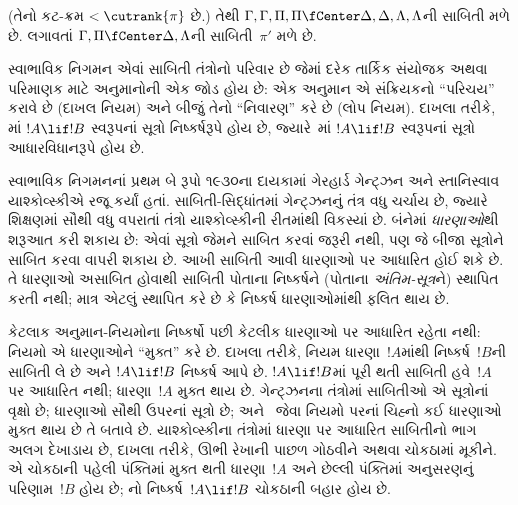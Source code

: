 (તેનો કટ-ક્રમ $< \cutrank{\pi}$ છે.)
તેથી
$\Gamma, \Gamma, \Pi, \Pi
\fCenter \Delta, \Delta, \Lambda, \Lambda$ની
સાબિતી મળે છે.
લગાવતાં
$\Gamma, \Pi \fCenter \Delta, \Lambda$ની
સાબિતી~$\pi'$ મળે છે.
\endgroup
\endgroup

\begingroup
\makeatletter{}\makeatother

\label{guunit:OLP-0664}


\begingroup
\makeatletter{}\makeatother


\label{guunit:OLP-0663}


સ્વાભાવિક નિગમન એવાં સાબિતી
તંત્રોનો પરિવાર છે જેમાં દરેક
તાર્કિક સંયોજક અથવા પરિમાણક
માટે અનુમાનોની એક જોડ હોય છે:
એક અનુમાન એ સંક્રિયકનો
``પરિચય'' કરાવે છે
(દાખલ નિયમ)
અને બીજું તેનો
``નિવારણ'' કરે છે
(લોપ નિયમ).
દાખલા તરીકે, \Intro{\lif}માં
$!A \lif !B$ સ્વરૂપનાં
સૂત્રો નિષ્કર્ષરૂપે હોય છે,
જ્યારે~\Elim{\lif}માં
$!A \lif !B$ સ્વરૂપનાં
સૂત્રો
આધારવિધાનરૂપે હોય છે.

સ્વાભાવિક નિગમનનાં પ્રથમ બે
રૂપો ૧૯૩૦ના દાયકામાં ગેરહાર્ડ
ગેન્ટ્ઝન અને સ્તાનિસ્વાવ
યાશ્કોવ્સ્કીએ રજૂ કર્યાં હતાં.
સાબિતી-સિદ્ધાંતમાં ગેન્ટ્ઝનનું
તંત્ર વધુ ચર્ચાય છે, જ્યારે
શિક્ષણમાં સૌથી વધુ વપરાતાં
તંત્રો યાશ્કોવ્સ્કીની રીતમાંથી
વિકસ્યાં છે. બંનેમાં
\emph{ધારણાઓ}થી શરૂઆત
કરી શકાય છે: એવાં
સૂત્રો જેમને
સાબિત કરવાં જરૂરી
નથી, પણ જે બીજા
સૂત્રોને સાબિત
કરવા વાપરી શકાય છે.
આખી સાબિતી આવી
ધારણાઓ પર આધારિત હોઈ
શકે છે. તે ધારણાઓ
અસાબિત હોવાથી સાબિતી
પોતાના નિષ્કર્ષને
(પોતાના \emph{અંતિમ-સૂત્ર}ને)
સ્થાપિત કરતી નથી;
માત્ર એટલું સ્થાપિત
કરે છે કે નિષ્કર્ષ
ધારણાઓમાંથી ફલિત થાય છે.

કેટલાક અનુમાન-નિયમોના
નિષ્કર્ષો પછી કેટલીક ધારણાઓ
પર આધારિત રહેતા નથી:
નિયમો એ ધારણાઓને
``મુક્ત'' કરે છે.
દાખલા તરીકે,
\Intro{\lif} નિયમ
ધારણા~$!A$માંથી
નિષ્કર્ષ~$!B$ની
સાબિતી લે છે અને
$!A \lif !B$ નિષ્કર્ષ આપે છે.
$!A \lif !B$માં પૂરી થતી
સાબિતી હવે~$!A$ પર
આધારિત નથી; ધારણા~$!A$
મુક્ત થાય છે.
ગેન્ટ્ઝનના તંત્રોમાં
સાબિતીઓ એ
સૂત્રોનાં વૃક્ષો છે;
ધારણાઓ સૌથી ઉપરનાં
સૂત્રો છે;
અને~\Intro{\lif} જેવા
નિયમો પરનાં ચિહ્નો કઈ
ધારણાઓ મુક્ત થાય છે
તે બતાવે છે.
યાશ્કોવ્સ્કીના તંત્રોમાં
ધારણા પર આધારિત
સાબિતીનો ભાગ અલગ
દેખાડાય છે, દાખલા તરીકે,
ઊભી રેખાની પાછળ
ગોઠવીને અથવા ચોકઠામાં
મૂકીને. એ ચોકઠાની
પહેલી પંક્તિમાં મુક્ત
થતી ધારણા~$!A$ અને
છેલ્લી પંક્તિમાં
અનુસરણનું પરિણામ~$!B$
હોય છે; \Intro{\lif}નો
નિષ્કર્ષ~$!A \lif !B$
ચોકઠાની બહાર હોય છે.

